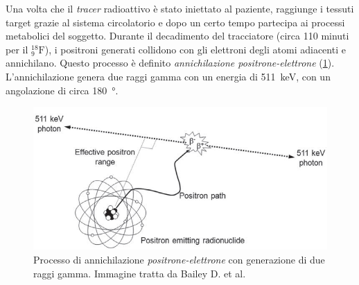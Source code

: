 Una volta che il \textit{tracer} radioattivo è stato iniettato al paziente, raggiunge i tessuti target grazie al sistema circolatorio e dopo un certo tempo partecipa ai processi metabolici del soggetto. Durante il decadimento del tracciatore (circa 110 minuti per il $^{18}_9\text{F}$), i positroni generati collidono con gli elettroni degli atomi adiacenti e annichilano. Questo processo è definito \textit{annichilazione positrone-elettrone} (\Fig\ref{fig:annihilation}). L'annichilazione genera due raggi gamma con un energia di \SI{511}{\kilo\electronvolt}, con un angolazione di circa \SI{180}{\degree}.
\begin{figure}[h]
	\centering
	\includegraphics[width=0.8\linewidth]{./ImageFiles/annihilation}
	\caption{Processo di annichilazione \textit{positrone-elettrone} con generazione di due raggi gamma. Immagine tratta da Bailey D. et al\cite{Bailey2014}.}
	\label{fig:annihilation}
\end{figure}
